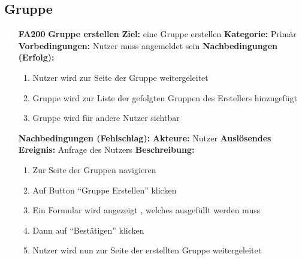 \documentclass[parskip=full]{scrartcl}
\begin{document}
		
		\subsection{Gruppe} \label{sec:FAGruppe}
		\begin{itemize}[nosep]
			\item[\textbf{FA200}]\textbf{Gruppe erstellen}
			\newline \textbf{Ziel:} eine Gruppe erstellen
			\newline \textbf{Kategorie:} Primär
			\newline \textbf{Vorbedingungen:} Nutzer muss angemeldet sein
			\newline \textbf{Nachbedingungen (Erfolg):} 
			\begin{enumerate}[nosep]
				\item Nutzer wird zur Seite der Gruppe weitergeleitet
				\item Gruppe wird zur Liste der gefolgten Gruppen des Erstellers hinzugefügt
				\item Gruppe wird für andere Nutzer sichtbar
			\end{enumerate}
			\textbf{Nachbedingungen (Fehlschlag):}
			\newline \textbf{Akteure:} Nutzer
			\newline \textbf{Auslösendes Ereignis:} Anfrage des Nutzers
			\newline \textbf{Beschreibung:}
			\begin{enumerate}[nosep]
				\item Zur Seite der Gruppen navigieren
				\item Auf \gls{Button} “Gruppe Erstellen” klicken
				\item Ein Formular wird angezeigt , welches ausgefüllt werden muss
				\item Dann auf “Bestätigen” klicken
				\item Nutzer wird nun zur Seite der erstellten Gruppe weitergeleitet\\
			\end{enumerate}
			

\end{itemize}
\end{document}
